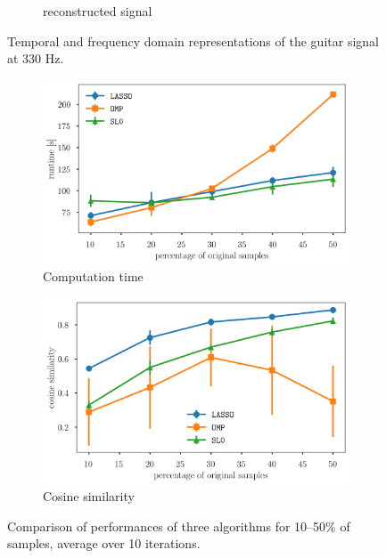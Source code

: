 \documentclass[10pt,a4paper,twoside]{article}
\begin{document}
\begin{figure}[!htb]
\begin{subfigure}{0.32\linewidth}
		\caption{reconstructed signal}
		\label{fig:record-recon-lasso}
	\end{subfigure}
	\caption{Temporal and frequency domain representations of the guitar signal at 330 Hz.}
\end{figure}

\begin{figure}[!htb]
	\centering
	\begin{subfigure}{0.43\linewidth}
		\centering
		\includegraphics[width=\linewidth]{processtime.png}
		\caption{Computation time}
		\label{fig:process-time}
	\end{subfigure}
	\begin{subfigure}{0.43\linewidth}
		\centering
		\includegraphics[width=\linewidth]{cossim.png}
		\caption{Cosine similarity}
		\label{fig:cossim}
	\end{subfigure}
	\caption{Comparison of performances of three algorithms for 10--50\% of samples, average over 10 iterations.}
	\label{fig:comparison}
\end{figure}
\end{document}
